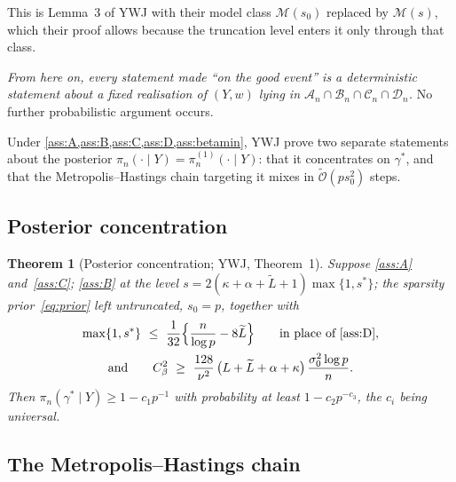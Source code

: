 \documentclass[aos]{imsart}
\newcommand{\Ltil}{\widetilde{L}}
\newcommand{\OO}{\mathcal{O}}  %
\theoremstyle{plain}
\newtheorem{theorem}{Theorem}[section]
\theoremstyle{definition}
\begin{document}
    This is Lemma~3 of YWJ with their model class $\mathscr{M}(s_0)$ replaced
    by $\mathscr{M}(s)$, which their proof allows because the truncation
    level enters it only through that class.

    \emph{From here on, every statement made ``on the good event'' is a
    deterministic statement about a fixed realisation of $(Y,w)$ lying in
        $\mathcal{A}_n\cap\mathcal{B}_n\cap\mathcal{C}_n\cap\mathcal{D}_n$.} No
    further probabilistic argument occurs.



    \label{sec:ywj}

    Under \cref{ass:A,ass:B,ass:C,ass:D,ass:betamin}, YWJ prove two separate
    statements about the
    posterior $\pi_n(\cdot\mid Y)=\pi_n^{(1)}(\cdot\mid Y)$: that
    it concentrates on $\gamma^{\ast}$, and that the Metropolis--Hastings
    chain targeting it mixes in $\tilde{\OO}(ps_0^2)$ steps.

    \subsection{Posterior concentration}
    \label{sub:ywjconc}

    \begin{theorem}[Posterior concentration; YWJ, Theorem~1]
        \label{th:ywj1}
        Suppose \cref{ass:A} and~\cref{ass:C}; \cref{ass:B} at the level
        $s=2(\kappa+\alpha+\Ltil+1)\max\{1,s^{\ast}\}$; the sparsity
        prior~\eqref{eq:prior} left untruncated, $s_0=p$, together with
        \begin{gather*}
            \max\{1,s^{\ast}\}\ \leq\ \frac{1}{32}
            \Bigl\{\frac{n}{\log p}-8\Ltil\Bigr\}
            \qquad\text{in place of \cref{ass:D}},\\
            \text{and}\qquad
            C_\beta^{2}\ \geq\ \frac{128}{\nu^{2}}\,
            \bigl(L+\Ltil+\alpha+\kappa\bigr)\,
            \frac{\sigma_0^{2}\log p}{n} .
        \end{gather*}
        Then $\pi_n(\gamma^{\ast}\mid Y)\geq1-c_1p^{-1}$ with probability at
        least $1-c_2p^{-c_3}$, the $c_i$ being universal.
    \end{theorem}

    \subsection{The Metropolis--Hastings chain}
    \label{sub:kernel}
\end{document}
